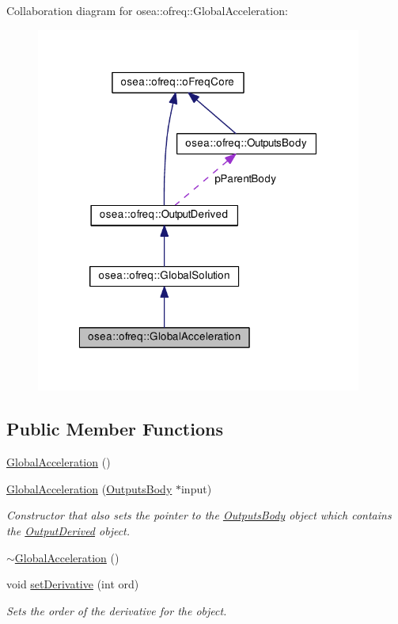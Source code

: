 Collaboration diagram for osea\-:\-:ofreq\-:\-:Global\-Acceleration\-:
\nopagebreak
\begin{figure}[H]
\begin{center}
\leavevmode
\includegraphics[width=304pt]{classosea_1_1ofreq_1_1_global_acceleration__coll__graph}
\end{center}
\end{figure}
\subsection*{Public Member Functions}
\begin{DoxyCompactItemize}
\item 
\hyperlink{classosea_1_1ofreq_1_1_global_acceleration_a37a05fcecd06641847388428a3f43fb8}{Global\-Acceleration} ()
\item 
\hyperlink{classosea_1_1ofreq_1_1_global_acceleration_acf5cd2816897a20982767248ae88ed07}{Global\-Acceleration} (\hyperlink{classosea_1_1ofreq_1_1_outputs_body}{Outputs\-Body} $\ast$input)
\begin{DoxyCompactList}\small\item\em Constructor that also sets the pointer to the \hyperlink{classosea_1_1ofreq_1_1_outputs_body}{Outputs\-Body} object which contains the \hyperlink{classosea_1_1ofreq_1_1_output_derived}{Output\-Derived} object. \end{DoxyCompactList}\item 
\hyperlink{classosea_1_1ofreq_1_1_global_acceleration_aafb7853a1923f0e06b96f2ef4eca03d3}{$\sim$\-Global\-Acceleration} ()
\item 
void \hyperlink{classosea_1_1ofreq_1_1_global_acceleration_a14a041ea42d4c1bc10211c9a44aa3431}{set\-Derivative} (int ord)
\begin{DoxyCompactList}\small\item\em Sets the order of the derivative for the object. \end{DoxyCompactList}\end{DoxyCompactItemize}
